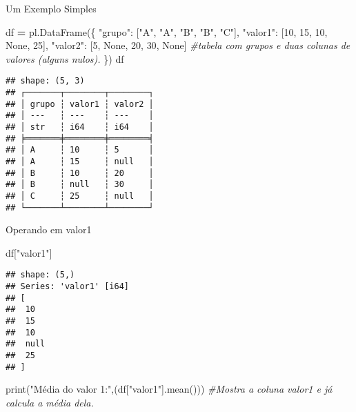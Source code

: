 \documentclass[
]{article}
\newenvironment{Shaded}{\begin{snugshade}}{\end{snugshade}}
\newcommand{\BuiltInTok}[1]{#1}
\newcommand{\CommentTok}[1]{\textcolor[rgb]{0.56,0.35,0.01}{\textit{#1}}}
\newcommand{\DecValTok}[1]{\textcolor[rgb]{0.00,0.00,0.81}{#1}}
\newcommand{\NormalTok}[1]{#1}
\newcommand{\OperatorTok}[1]{\textcolor[rgb]{0.81,0.36,0.00}{\textbf{#1}}}
\newcommand{\StringTok}[1]{\textcolor[rgb]{0.31,0.60,0.02}{#1}}
\newcommand{\VariableTok}[1]{\textcolor[rgb]{0.00,0.00,0.00}{#1}}
\begin{document}
Um Exemplo Simples

\begin{Shaded}
\begin{Highlighting}[]
\NormalTok{df }\OperatorTok{=}\NormalTok{ pl.DataFrame(\{}
    \StringTok{"grupo"}\NormalTok{: [}\StringTok{"A"}\NormalTok{, }\StringTok{"A"}\NormalTok{, }\StringTok{"B"}\NormalTok{, }\StringTok{"B"}\NormalTok{, }\StringTok{"C"}\NormalTok{],}
    \StringTok{"valor1"}\NormalTok{: [}\DecValTok{10}\NormalTok{, }\DecValTok{15}\NormalTok{, }\DecValTok{10}\NormalTok{, }\VariableTok{None}\NormalTok{, }\DecValTok{25}\NormalTok{],}
    \StringTok{"valor2"}\NormalTok{: [}\DecValTok{5}\NormalTok{, }\VariableTok{None}\NormalTok{, }\DecValTok{20}\NormalTok{, }\DecValTok{30}\NormalTok{, }\VariableTok{None}\NormalTok{] }\CommentTok{\#tabela com grupos e duas colunas de valores (alguns nulos).}
\NormalTok{\})}
\NormalTok{df}
\end{Highlighting}
\end{Shaded}

\begin{verbatim}
## shape: (5, 3)
## ┌───────┬────────┬────────┐
## │ grupo ┆ valor1 ┆ valor2 │
## │ ---   ┆ ---    ┆ ---    │
## │ str   ┆ i64    ┆ i64    │
## ╞═══════╪════════╪════════╡
## │ A     ┆ 10     ┆ 5      │
## │ A     ┆ 15     ┆ null   │
## │ B     ┆ 10     ┆ 20     │
## │ B     ┆ null   ┆ 30     │
## │ C     ┆ 25     ┆ null   │
## └───────┴────────┴────────┘
\end{verbatim}

Operando em valor1

\begin{Shaded}
\begin{Highlighting}[]
\NormalTok{df[}\StringTok{"valor1"}\NormalTok{]}
\end{Highlighting}
\end{Shaded}

\begin{verbatim}
## shape: (5,)
## Series: 'valor1' [i64]
## [
##  10
##  15
##  10
##  null
##  25
## ]
\end{verbatim}

\begin{Shaded}
\begin{Highlighting}[]
\BuiltInTok{print}\NormalTok{(}\StringTok{"Média do valor 1:"}\NormalTok{,(df[}\StringTok{"valor1"}\NormalTok{].mean())) }\CommentTok{\#Mostra a coluna valor1 e já calcula a média dela.}
\end{Highlighting}
\end{Shaded}
\end{document}
